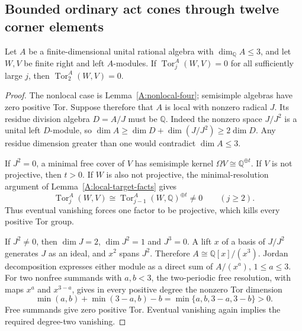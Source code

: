\subsection{Bounded ordinary act cones through twelve corner elements}

\begin{lemma}
\label{CP2:A-three-dimensional-bounded-Tor}
Let $A$ be a finite-dimensional unital rational algebra with
$\dim_{\mathbb Q}A\leq3$, and let $W,V$ be finite right and left
$A$-modules. If $\operatorname{Tor}^A_j(W,V)=0$ for all sufficiently
large $j$, then $\operatorname{Tor}^A_2(W,V)=0$.
\end{lemma}
\begin{proof}
The nonlocal case is Lemma~\ref{A:nonlocal-four}; semisimple
algebras have zero positive Tor. Suppose therefore that $A$ is
local with nonzero radical $J$. Its residue division algebra
$D=A/J$ must be $\mathbb Q$. Indeed the nonzero space $J/J^2$
is a unital left $D$-module, so
$\dim A\geq\dim D+\dim(J/J^2)\geq2\dim D$.
Any residue dimension greater than one would contradict
$\dim A\leq3$.

If $J^2=0$, a minimal free cover of $V$ has semisimple kernel
$\Omega V\cong\mathbb Q^{\oplus t}$. If $V$ is not projective,
then $t>0$. If $W$ is also not projective, the minimal-resolution
argument of Lemma~\ref{A:local-target-facts} gives
\[
 \operatorname{Tor}^A_j(W,V)
 \cong \operatorname{Tor}^A_{j-1}(W,\mathbb Q)^{\oplus t}
 \ne0\qquad(j\geq2).
\]
Thus eventual vanishing forces one factor to be projective,
which kills every positive Tor group.

If $J^2\ne0$, then $\dim J=2$, $\dim J^2=1$ and $J^3=0$.
A lift $x$ of a basis of $J/J^2$ generates $J$ as an ideal,
and $x^2$ spans $J^2$. Therefore $A\cong\mathbb Q[x]/(x^3)$.
Jordan decomposition expresses either module as a direct sum
of $A/(x^a)$, $1\leq a\leq3$. For two nonfree summands
with $a,b<3$, the two-periodic free resolution, with maps
$x^a$ and $x^{3-a}$, gives in every positive degree the
nonzero Tor dimension
\[
 \min(a,b)+\min(3-a,b)-b
 =\min\{a,b,3-a,3-b\}>0.
\]
Free summands give zero positive Tor. Eventual vanishing again
implies the required degree-two vanishing.
\end{proof}

